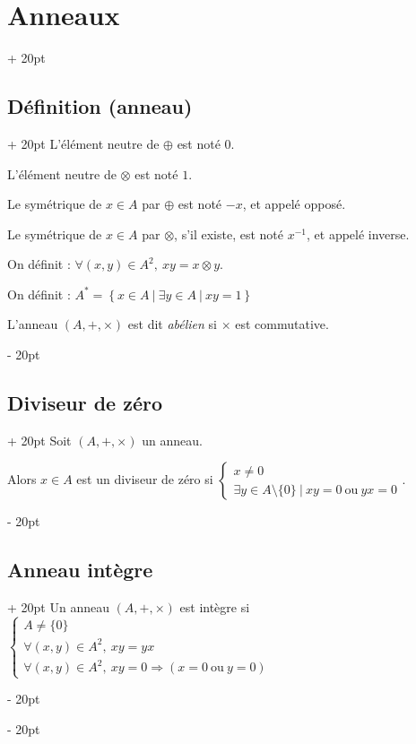 \documentclass[a4paper, 12pt, twoside]{article}
\newcommand{\ind}[1][20pt]{\advance\leftskip + #1}
\newcommand{\deind}[1][20pt]{\advance\leftskip - #1}
\newenvironment{indentedenv}[1][20pt]{\par \ind[#1]}{\par \deind}
\newenvironment{indt}[2][20pt]{#2 \begin{indentedenv}[#1]}{\end{indentedenv}} %
\begin{document}
\begin{indt}{\section{Anneaux}}
\begin{indt}{\subsection{Définition (anneau)}}
            L'élément neutre de $\oplus$ est noté $0$.
            
            L'élément neutre de $\otimes$ est noté $1$.
            
            Le symétrique de $x \in A$ par $\oplus$ est noté $-x$, et appelé opposé.
            
            Le symétrique de $x \in A$ par $\otimes$, s'il existe, est noté $x^{-1}$, et appelé inverse.
            
            On définit : $\forall (x, y) \in A^2,\ xy = x \otimes y$.
            
            On définit : $A^* = \left\{ x \in A\ |\ \exists y \in A\ |\ xy = 1 \right\}$
            
            \vspace{6pt}
            
            L'anneau $(A, +, \times)$ est dit \textit{abélien} si $\times$ est commutative.
        \end{indt}
        
        \vspace{6pt}
        
        \begin{indt}{\subsection{Diviseur de zéro}}
            Soit $(A, +, \times)$ un anneau.
            
            Alors $x \in A$ est un diviseur de zéro si
            $
                \begin{cases}
                    x \neq 0
                    \\
                    \exists y \in A \setminus \{0\}\ |\ xy = 0\ \text{ou}\ yx = 0
                \end{cases}
            $.
        \end{indt}
        
        \vspace{6pt}
        
        \begin{indt}{\subsection{Anneau intègre}}
            Un anneau $(A, +, \times)$ est intègre si
            $
                \begin{cases}
                    A \neq \{ 0 \}
                    \\
                    \forall (x, y) \in A^2,\ xy = yx
                    \\
                    \forall (x, y) \in A^2,\ xy = 0 \Rightarrow (x = 0\ \text{ou}\ y = 0)
                \end{cases}
            $
        \end{indt}
        

\end{indt}
\end{document}
